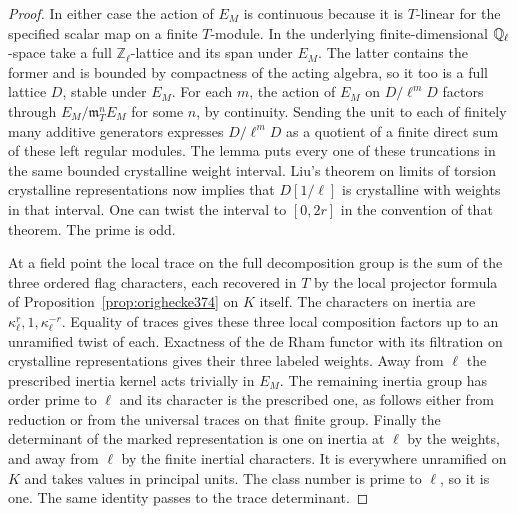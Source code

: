 \documentclass[a4paper,11pt]{article}
\theoremstyle{definition}
\theoremstyle{remark}
\newcommand{\ZZ}{\mathbb Z}\newcommand{\ord}{\operatorname{ord}}
\numberwithin{equation}{section}
\begin{document}
\begin{proof}
In either case the action of \(E_M\) is continuous because it is
\(T\)-linear for the specified scalar map on a finite
\(T\)-module. In the underlying finite-dimensional
\(\mathbb Q_\ell\)-space take a full \(\ZZ_\ell\)-lattice and its
span under \(E_M\). The latter contains the former and is
bounded by compactness of the acting algebra, so it too
is a full lattice \(D\), stable under \(E_M\). For each
\(m\), the action of \(E_M\) on \(D/\ell^mD\) factors
through \(E_M/\mathfrak m_T^n E_M\) for some \(n\), by
continuity. Sending the unit to each of finitely many
additive generators expresses \(D/\ell^mD\) as a quotient
of a finite direct sum of these left regular modules.
The lemma puts every one of these truncations in the same
bounded crystalline weight interval. Liu's theorem on limits
of torsion crystalline representations now implies that
\(D[1/\ell]\) is crystalline with weights in that interval.
One can twist the interval to \([0,2r]\) in the convention
of that theorem. The prime is odd.~\cite{VII-V-liu375}

At a field point the local trace on the full decomposition
group is the sum of the three ordered flag characters,
each recovered in \(T\) by the local projector formula
of Proposition~\ref{prop:orighecke374} on \(K\) itself.
The characters on inertia are
\(\kappa_\ell^r,1,\kappa_\ell^{-r}\). Equality of traces
gives these three local composition factors up to an
unramified twist of each. Exactness of the de Rham functor
with its filtration on crystalline representations gives
their three labeled weights. Away from \(\ell\) the
prescribed inertia kernel acts trivially in \(E_M\).
The remaining inertia group has order prime to \(\ell\)
and its character is the prescribed one, as follows either
from reduction or from the universal traces on that finite
group. Finally the determinant of the marked representation
is one on inertia at \(\ell\) by the weights, and away from
\(\ell\) by the finite inertial characters. It is everywhere
unramified on \(K\) and takes values in principal units.
The class number is prime to \(\ell\), so it is one. The
same identity passes to the trace determinant.
\end{proof}
\end{document}
